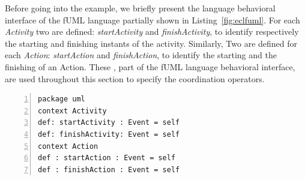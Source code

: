 Before going into the example, we briefly present the language behavioral interface of the fUML language partially shown in  Listing~\ref{fig:eclfuml}. For each \emph{Activity} two \dse are defined: \emph{startActivity} and \emph{finishActivity}, to identify respectively the starting and finishing instants of the activity. Similarly, Two \dse are defined for each \emph{Action}: \emph{startAction} and \emph{finishAction}, to identify the starting and the finishing of an Action. These \dse, part of the fUML language behavioral interface, are used throughout this section to specify the coordination operators.

\begin{lstlisting}[language=ecl,
caption={Partial \ecl specification of Activity Diagram},
label={fig:eclfuml}, 
basicstyle=\scriptsize\ttfamily, backgroundcolor=\color{LGrey}, numbers=left, xleftmargin=3pt, belowskip=-0.4em]
package uml
context Activity
def: startActivity : Event = self
def: finishActivity: Event = self
context Action
def : startAction : Event = self
def : finishAction : Event = self
\end{lstlisting}
